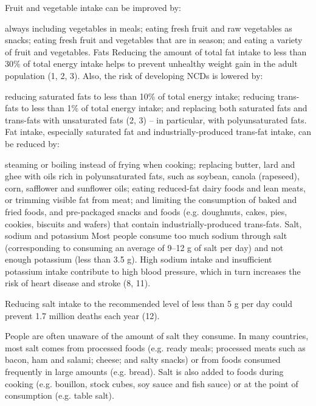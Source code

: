 \documentclass[
  letterpaper,
  DIV=11,
  numbers=noendperiod]{scrreprt}
\newenvironment{Shaded}{\begin{snugshade}}{\end{snugshade}}
\newcommand{\SpecialCharTok}[1]{\textcolor[rgb]{0.37,0.37,0.37}{#1}}
\newcommand{\StringTok}[1]{\textcolor[rgb]{0.13,0.47,0.30}{#1}}
\begin{document}
\begin{Shaded}
\begin{Highlighting}[]
\StringTok{Fruit and vegetable intake can be improved by:}

\StringTok{always including vegetables in meals;}
\StringTok{eating fresh fruit and raw vegetables as snacks;}
\StringTok{eating fresh fruit and vegetables that are in season; and}
\StringTok{eating a variety of fruit and vegetables.}
\StringTok{Fats}
\StringTok{Reducing the amount of total fat intake to less than 30}\SpecialCharTok{\% o}\StringTok{f total energy intake helps to prevent unhealthy weight gain in the adult population (1, 2, 3). Also, the risk of developing NCDs is lowered by:}

\StringTok{reducing saturated fats to less than 10}\SpecialCharTok{\% o}\StringTok{f total energy intake;}
\StringTok{reducing trans{-}fats to less than 1}\SpecialCharTok{\% o}\StringTok{f total energy intake; and}
\StringTok{replacing both saturated fats and trans{-}fats with unsaturated fats (2, 3) – in particular, with polyunsaturated fats.}
\StringTok{Fat intake, especially saturated fat and industrially{-}produced trans{-}fat intake, can be reduced by:}

\StringTok{steaming or boiling instead of frying when cooking;}
\StringTok{replacing butter, lard and ghee with oils rich in polyunsaturated fats, such as soybean, canola (rapeseed), corn, safflower and sunflower oils;}
\StringTok{eating reduced{-}fat dairy foods and lean meats, or trimming visible fat from meat; and}
\StringTok{limiting the consumption of baked and fried foods, and pre{-}packaged snacks and foods (e.g. doughnuts, cakes, pies, cookies, biscuits and wafers) that contain industrially{-}produced trans{-}fats.}
\StringTok{Salt, sodium and potassium}
\StringTok{Most people consume too much sodium through salt (corresponding to consuming an average of 9–12 g of salt per day) and not enough potassium (less than 3.5 g). High sodium intake and insufficient potassium intake contribute to high blood pressure, which in turn increases the risk of heart disease and stroke (8, 11).}

\StringTok{Reducing salt intake to the recommended level of less than 5 g per day could prevent 1.7 million deaths each year (12).}

\StringTok{People are often unaware of the amount of salt they consume. In many countries, most salt  comes from processed foods (e.g. ready meals; processed meats such as bacon, ham and salami; cheese; and salty snacks) or from foods consumed frequently in large amounts (e.g. bread). Salt is also added to foods during cooking (e.g. bouillon, stock cubes, soy sauce and fish sauce) or at the point of consumption (e.g. table salt).}


\end{Highlighting}
\end{Shaded}
\end{document}
